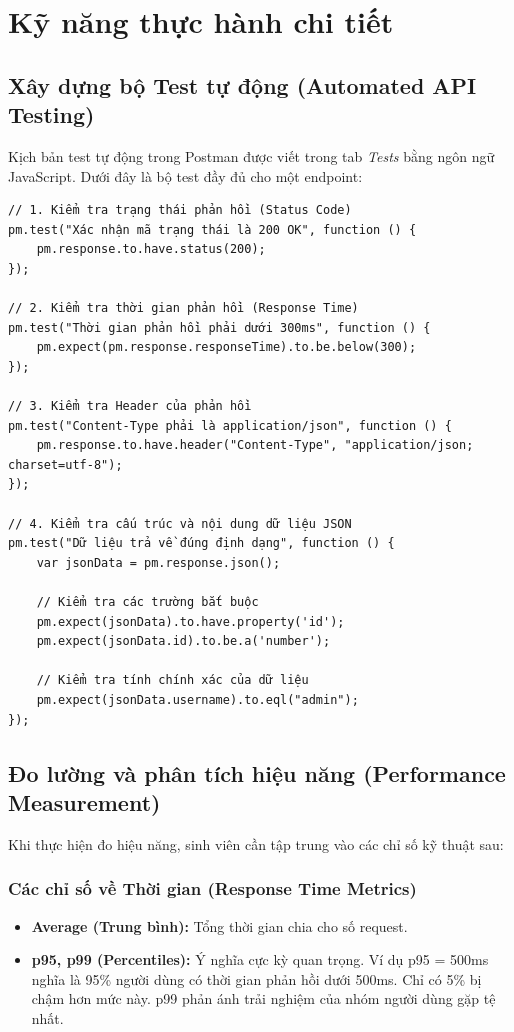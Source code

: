 \documentclass[12pt, a4paper]{article}
\begin{document}
\section{Kỹ năng thực hành chi tiết}

\subsection{Xây dựng bộ Test tự động (Automated API Testing)}
Kịch bản test tự động trong Postman được viết trong tab \textit{Tests} bằng ngôn ngữ JavaScript. Dưới đây là bộ test đầy đủ cho một endpoint:

\begin{lstlisting}[caption=Kịch bản kiểm thử tự động toàn diện]
// 1. Kiểm tra trạng thái phản hồi (Status Code)
pm.test("Xác nhận mã trạng thái là 200 OK", function () {
    pm.response.to.have.status(200);
});

// 2. Kiểm tra thời gian phản hồi (Response Time)
pm.test("Thời gian phản hồi phải dưới 300ms", function () {
    pm.expect(pm.response.responseTime).to.be.below(300);
});

// 3. Kiểm tra Header của phản hồi
pm.test("Content-Type phải là application/json", function () {
    pm.response.to.have.header("Content-Type", "application/json; charset=utf-8");
});

// 4. Kiểm tra cấu trúc và nội dung dữ liệu JSON
pm.test("Dữ liệu trả về đúng định dạng", function () {
    var jsonData = pm.response.json();
    
    // Kiểm tra các trường bắt buộc
    pm.expect(jsonData).to.have.property('id');
    pm.expect(jsonData.id).to.be.a('number');
    
    // Kiểm tra tính chính xác của dữ liệu
    pm.expect(jsonData.username).to.eql("admin");
});
\end{lstlisting}

\subsection{Đo lường và phân tích hiệu năng (Performance Measurement)}
Khi thực hiện đo hiệu năng, sinh viên cần tập trung vào các chỉ số kỹ thuật sau:

\subsubsection{Các chỉ số về Thời gian (Response Time Metrics)}
\begin{itemize}
    \item \textbf{Average (Trung bình):} Tổng thời gian chia cho số request.
    \item \textbf{p95, p99 (Percentiles):} Ý nghĩa cực kỳ quan trọng. Ví dụ p95 = 500ms nghĩa là 95\% người dùng có thời gian phản hồi dưới 500ms. Chỉ có 5\% bị chậm hơn mức này. p99 phản ánh trải nghiệm của nhóm người dùng gặp tệ nhất.
\end{itemize}
\end{document}
